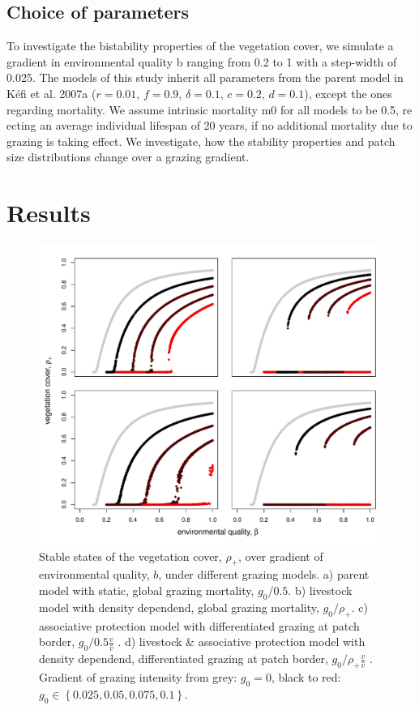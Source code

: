 \subsection{Choice of parameters}

To investigate the bistability properties of the vegetation cover, we simulate a gradient in environmental quality b ranging from 0.2 to 1 with a step-width of 0.025. The models of this study inherit all parameters from the parent model in K\'efi et al. 2007a ($r = 0.01$, $f = 0.9$, $\delta = 0.1$, $c = 0.2$, $d = 0.1$), except the ones regarding mortality. We assume intrinsic mortality m0 for all models to be 0.5, re
ecting an average individual lifespan of 20 years, if no additional mortality due to grazing is taking effect. We investigate, how the stability properties and patch size distributions change over a grazing gradient.



\section{Results}

\newpage

\begin{figure}%
\includegraphics[width=\columnwidth]{figures/stability.pdf}%
\caption{Stable states of the vegetation cover, $\rho_+$, over gradient of environmental quality, $b$, under different grazing models. a) parent model with static, global grazing mortality, $g_0/0.5$. b) livestock model with density dependend, global grazing mortality, $g_0 / \rho_+$. c) associative protection model with differentiated grazing at patch border, $g_0/0.5 \frac{v}{\hat{v}}$ . d) livestock \& associative protection model with density dependend, differentiated grazing at patch border,  $g_0/ \rho_+ \frac{v}{\hat{v}}$ . Gradient of grazing intensity from grey: $g_0 = 0$, black to red: $g_0 \in \left\{ 0.025, 0.05, 0.075, 0.1 \right\}$.}%
\label{}%
\end{figure}



